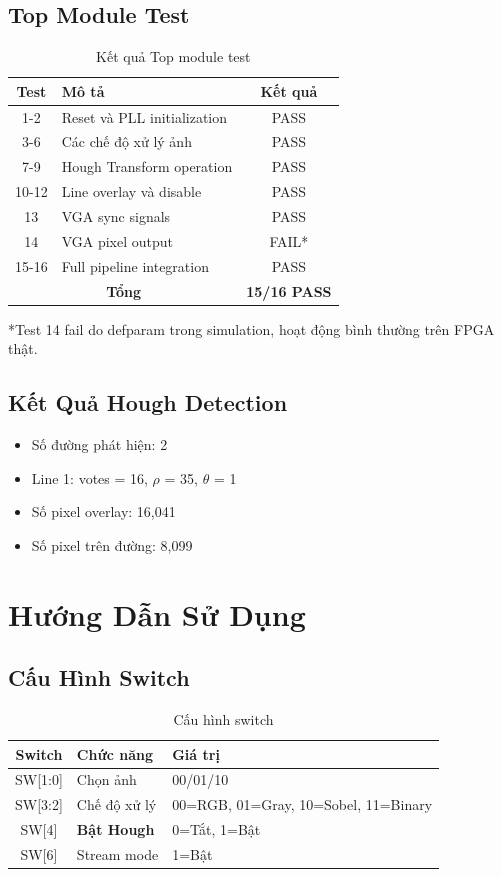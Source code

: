 \documentclass[12pt,a4paper]{report}
\begin{document}
\section{Top Module Test}

\begin{table}[h]
\centering
\begin{tabular}{|c|l|c|}
\hline
\textbf{Test} & \textbf{Mô tả} & \textbf{Kết quả} \\
\hline
1-2 & Reset và PLL initialization & PASS \\
3-6 & Các chế độ xử lý ảnh & PASS \\
7-9 & Hough Transform operation & PASS \\
10-12 & Line overlay và disable & PASS \\
13 & VGA sync signals & PASS \\
14 & VGA pixel output & FAIL* \\
15-16 & Full pipeline integration & PASS \\
\hline
\multicolumn{2}{|c|}{\textbf{Tổng}} & \textbf{15/16 PASS} \\
\hline
\end{tabular}
\caption{Kết quả Top module test}
\end{table}

*Test 14 fail do defparam trong simulation, hoạt động bình thường trên FPGA thật.

\section{Kết Quả Hough Detection}
\begin{itemize}
    \item Số đường phát hiện: 2
    \item Line 1: votes = 16, $\rho$ = 35, $\theta$ = 1
    \item Số pixel overlay: 16,041
    \item Số pixel trên đường: 8,099
\end{itemize}

\chapter{Hướng Dẫn Sử Dụng}

\section{Cấu Hình Switch}
\begin{table}[h]
\centering
\begin{tabular}{|c|l|l|}
\hline
\textbf{Switch} & \textbf{Chức năng} & \textbf{Giá trị} \\
\hline
SW[1:0] & Chọn ảnh & 00/01/10 \\
SW[3:2] & Chế độ xử lý & 00=RGB, 01=Gray, 10=Sobel, 11=Binary \\
SW[4] & \textbf{Bật Hough} & 0=Tắt, 1=Bật \\
SW[6] & Stream mode & 1=Bật \\
\hline
\end{tabular}
\caption{Cấu hình switch}
\end{table}
\end{document}
